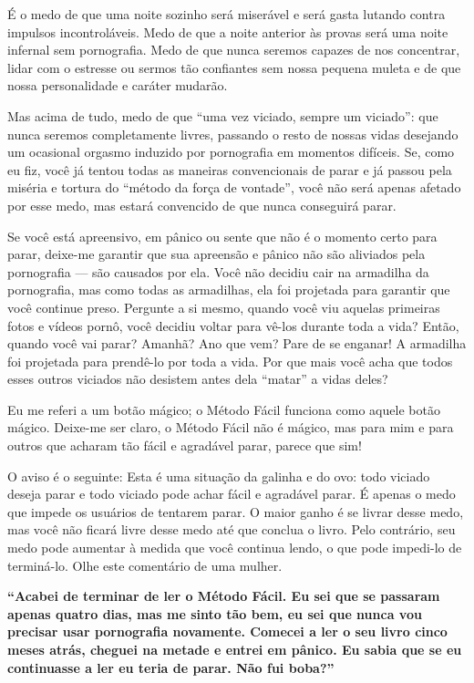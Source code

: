 \documentclass[
  spanish,
  openany]{book}
\begin{document}
É o medo de que uma noite sozinho será miserável e será gasta lutando contra impulsos incontroláveis. Medo de que a noite anterior às provas será uma noite infernal sem pornografia. Medo de que nunca seremos capazes de nos concentrar, lidar com o estresse ou sermos tão confiantes sem nossa pequena muleta e de que nossa personalidade e caráter mudarão.

Mas acima de tudo, medo de que ``uma vez viciado, sempre um viciado'': que nunca seremos completamente livres, passando o resto de nossas vidas desejando um ocasional orgasmo induzido por pornografia em momentos difíceis. Se, como eu fiz, você já tentou todas as maneiras convencionais de parar e já passou pela miséria e tortura do ``método da força de vontade'', você não será apenas afetado por esse medo, mas estará convencido de que nunca conseguirá parar.

Se você está apreensivo, em pânico ou sente que não é o momento certo para parar, deixe-me garantir que sua apreensão e pânico não são aliviados pela pornografia --- são causados por ela. Você não decidiu cair na armadilha da pornografia, mas como todas as armadilhas, ela foi projetada para garantir que você continue preso. Pergunte a si mesmo, quando você viu aquelas primeiras fotos e vídeos pornô, você decidiu voltar para vê-los durante toda a vida? Então, quando você vai parar? Amanhã? Ano que vem? Pare de se enganar! A armadilha foi projetada para prendê-lo por toda a vida. Por que mais você acha que todos esses outros viciados não desistem antes dela ``matar'' a vidas deles?

Eu me referi a um botão mágico; o Método Fácil funciona como aquele botão mágico. Deixe-me ser claro, o Método Fácil não é mágico, mas para mim e para outros que acharam tão fácil e agradável parar, parece que sim!

O aviso é o seguinte: Esta é uma situação da galinha e do ovo: todo viciado deseja parar e todo viciado pode achar fácil e agradável parar. É apenas o medo que impede os usuários de tentarem parar. O maior ganho é se livrar desse medo, mas você não ficará livre desse medo até que conclua o livro. Pelo contrário, seu medo pode aumentar à medida que você continua lendo, o que pode impedi-lo de terminá-lo. Olhe este comentário de uma mulher.

\textbf{``Acabei de terminar de ler o Método Fácil. Eu sei que se passaram apenas quatro dias, mas me sinto tão bem, eu sei que nunca vou precisar usar pornografia novamente. Comecei a ler o seu livro cinco meses atrás, cheguei na metade e entrei em pânico. Eu sabia que se eu continuasse a ler eu teria de parar. Não fui boba?''}
\end{document}
